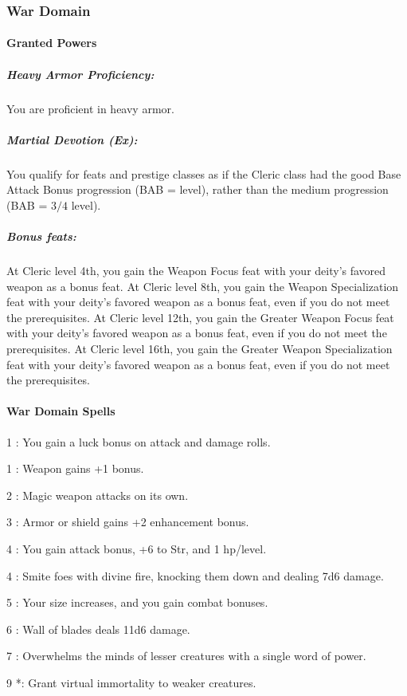 \subsubsection{War Domain}
\paragraph{Granted Powers}
\subparagraph{Heavy Armor Proficiency:}
You are proficient in heavy armor. 
\subparagraph{Martial Devotion (Ex):}
You qualify for feats and prestige classes as if the Cleric class
had the good Base Attack Bonus progression (BAB = level), rather than the medium progression (BAB = $3/4$ level).

\subparagraph{Bonus feats:}
At Cleric level 4th, you gain the Weapon Focus feat with your deity's favored weapon as a bonus feat.
At Cleric level 8th, you gain the Weapon Specialization feat with your deity's favored weapon as a bonus feat, even if you do not meet the prerequisites.
At Cleric level 12th, you gain the Greater Weapon Focus feat with your deity's favored weapon as a bonus feat, even if you do not meet the prerequisites.
At Cleric level 16th, you gain the Greater Weapon Specialization feat with your deity's favored weapon as a bonus feat, even if you do not meet the prerequisites.
\paragraph{War Domain Spells}
\begin{list}{}{\leftmargin=1em}
\item[1] : You gain a luck bonus on attack and damage rolls.
\item[1] : Weapon gains +1 bonus.
\item[2] : Magic weapon attacks on its own.
\item[3] : Armor or shield gains +2 enhancement bonus.
\item[4] : You gain attack bonus, +6 to Str, and 1 hp/level.
\item[4] : Smite foes with divine fire, knocking them down and dealing 7d6 damage.
\item[5] : Your size increases, and you gain combat bonuses.
\item[6] : Wall of blades deals 11d6 damage.
\item[7] : Overwhelms the minds of lesser creatures with a single word of power.
\item[9] *: Grant virtual immortality to weaker creatures.
\end{list}
